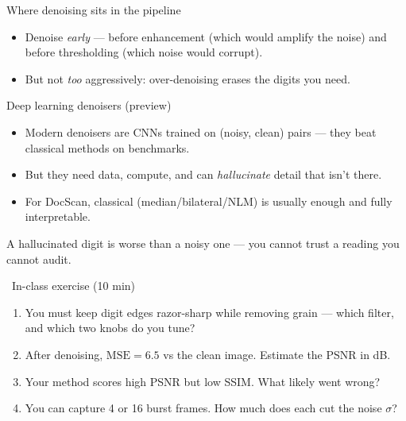 \documentclass[10pt,aspectratio=169]{beamer}
\begin{document}
\begin{frame}{Where denoising sits in the pipeline}
  \begin{center}
  \end{center}
  \begin{itemize}
    \item Denoise \emph{early} — before enhancement (which would amplify the noise) and before thresholding (which noise would corrupt).
    \item But not \emph{too} aggressively: over-denoising erases the digits you need.
  \end{itemize}
\end{frame}

\begin{frame}{Deep learning denoisers (preview)}
  \begin{itemize}
    \item Modern denoisers are CNNs trained on (noisy, clean) pairs — they beat classical methods on benchmarks.
    \item But they need data, compute, and can \emph{hallucinate} detail that isn't there.
    \item For DocScan, classical (median/bilateral/NLM) is usually enough and fully interpretable.
  \end{itemize}
  \begin{badbox}
    A hallucinated digit is worse than a noisy one — you cannot trust a reading you cannot audit.
  \end{badbox}
\end{frame}

\begin{frame}{\faPen~In-class exercise (10 min)}
  \begin{infobox}
  \end{infobox}
  \begin{enumerate}
    \item You must keep digit edges razor-sharp while removing grain — which filter, and which two knobs do you tune?
    \item After denoising, $\mathrm{MSE}=6.5$ vs the clean image. Estimate the PSNR in dB.
    \item Your method scores high PSNR but low SSIM. What likely went wrong?
    \item You can capture 4 or 16 burst frames. How much does each cut the noise $\sigma$?
  \end{enumerate}
\end{frame}
\end{document}
